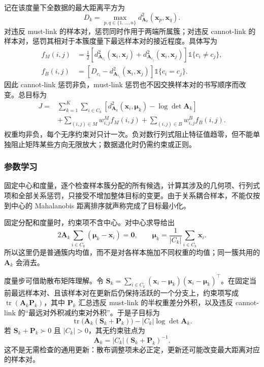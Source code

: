 记在该度量下全数据的最大距离平方为
\[
 D_k=\max_{p,q\in\{1,\ldots,n\}}
 d_{\bm{A}_k}^2(\bm{x}_p,\bm{x}_q).
\]
对违反 must-link 的样本对，惩罚同时作用于两端所属簇；对违反 cannot-link 的样本对，惩罚其相对于本簇度量下最远样本对的接近程度。具体写为
\begin{align}
 f_M(i,j)
 &=\frac12\left[
 d_{\bm{A}_{c_i}}^2(\bm{x}_i,\bm{x}_j)
 +d_{\bm{A}_{c_j}}^2(\bm{x}_i,\bm{x}_j)\right]
 \mathbb{1}\{c_i\ne c_j\},\nonumber\\
 f_B(i,j)
 &=\left[D_{c_i}
 -d_{\bm{A}_{c_i}}^2(\bm{x}_i,\bm{x}_j)\right]
 \mathbb{1}\{c_i=c_j\}.
 \label{eq:clustering-mpck-penalty}
\end{align}
因此 cannot-link 惩罚非负，must-link 惩罚也不因交换样本对的书写顺序而改变。总目标为
\begin{equation}
 \begin{aligned}
 J={}&\sum_{k=1}^K\sum_{i\in C_k}
 \left[d_{\bm{A}_k}^2(\bm{x}_i,\bm{\mu}_k)
       -\log\det\bm{A}_k\right]\\
 &+\sum_{(i,j)\in M}w_{i,j}^{M}f_M(i,j)
  +\sum_{(i,j)\in B}w_{i,j}^{B}f_B(i,j).
 \end{aligned}
 \label{eq:clustering-mpck}
\end{equation}
权重均非负，每个无序约束对只计一次。负对数行列式阻止特征值趋零，但不能单独阻止矩阵某些方向无限放大；数据退化时仍需约束或正则。

\subsubsection{参数学习}

固定中心和度量，逐个检查样本簇分配的所有候选，计算其涉及的几何项、行列式项和全部关系惩罚，只接受不增加整体目标的变更。由于关系耦合样本，不能仅按到中心的 Mahalanobis 距离排序就声称完成了目标最小化。

固定分配和度量时，约束项不含中心。对中心求导给出
\[
 2\bm{A}_k\sum_{i\in C_k}(\bm{\mu}_k-\bm{x}_i)=\bm{0},
 \qquad
 \bm{\mu}_k=\frac{1}{|C_k|}\sum_{i\in C_k}\bm{x}_i.
\]
所以这里仍是普通簇内均值，而不是对各样本施加不同权重的均值；同一簇共用的 $\bm{A}_k$ 会消去。

度量步可借助散布矩阵理解。令 $\bm{S}_k=\sum_{i\in C_k}(\bm{x}_i-\bm{\mu}_k)(\bm{x}_i-\bm{\mu}_k)^\top$。在固定当前最远样本对、且该样本对在更新后仍保持活跃的一个分支上，约束项写成 $\operatorname{tr}(\bm{A}_k\bm{P}_k)$，其中 $\bm{P}_k$ 汇总违反 must-link 的半权重差分外积，以及违反 cannot-link 的“最远对外积减约束对外积”。于是子目标为
\[
 \operatorname{tr}\bigl(\bm{A}_k(\bm{S}_k+\bm{P}_k)\bigr)
 -|C_k|\log\det\bm{A}_k.
\]
若 $\bm{S}_k+\bm{P}_k\succ0$ 且 $|C_k|>0$，其无约束驻点为
\begin{equation}
 \bm{A}_k=|C_k|(\bm{S}_k+\bm{P}_k)^{-1}.
 \label{eq:clustering-mpck-metric}
\end{equation}
这不是无需检查的通用更新：散布调整项未必正定，更新还可能改变最大距离对应的样本对。

